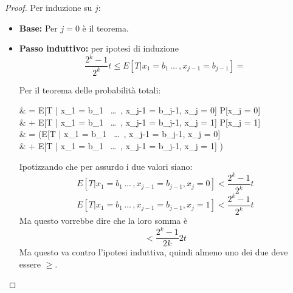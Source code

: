 \begin{proof}
	Per induzione su $j$:
	\begin{itemize}
		\item \textbf{Base:} Per $j=0$ è il teorema.\\
		
		\item \textbf{Passo induttivo:} per ipotesi di induzione
		$$\frac{2^k-1}{2^k} t \leq  E[T |  x_1 = b_1 \, \dots \, , x_{j-1} = b_{j-1}] = $$
		
		Per il teorema delle probabilità totali:
		\begin{flalign*}
			& = E[T |  x_1 = b_1 \, \dots \, , x_{j-1} = b_{j-1}, x_j = 0] P[x_j = 0]  \\
			& \hspace*{3cm} + E[T |  x_1 = b_1 \, \dots \, , x_{j-1} = b_{j-1}, x_j = 1] P[x_j = 1] \\
			& =  (E[T |  x_1 = b_1 \, \dots \, , x_{j-1} = b_{j-1}, x_j = 0] \\ 
			& \hspace*{3cm} + E[T |  x_1 = b_1 \, \dots \, , x_{j-1} = b_{j-1}, x_j = 1] )
		\end{flalign*}
		Ipotizzando che per assurdo i due valori siano: 
		$$ 
		E[T |  x_1 = b_1 \, \dots \, , x_{j-1} = b_{j-1}, x_j = 0] < \frac{2^k-1}{2^k} t
		$$
		$$
		E[T |  x_1 = b_1 \, \dots \, , x_{j-1} = b_{j-1}, x_j = 1] < \frac{2^k-1}{2^k} t
		$$
		Ma questo vorrebbe dire che la loro somma è
		$$ 
		< \frac{2^k - 1}{2k} 2t 
		$$
		Ma questo va contro l'ipotesi induttiva, quindi almeno uno dei due deve essere $\geq$.\\
	\end{itemize}
\end{proof}


